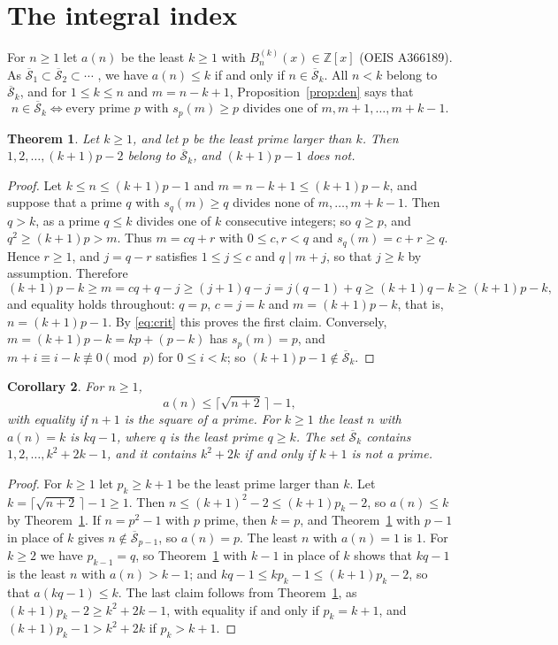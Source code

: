 \documentclass[11pt]{amsart}
\newtheorem{theorem}{Theorem}
\newtheorem{corollary}[theorem]{Corollary}
\theoremstyle{remark}
\numberwithin{equation}{section}
\newcommand{\ZZ}{\mathbb Z}
\newcommand{\Sb}{\overline{\mathcal S}}
\begin{document}
\section{The integral index}\label{sec:index}

For $n\ge1$ let $a(n)$ be the least $k\ge1$ with $B_n^{(k)}(x)\in\ZZ[x]$ (OEIS A366189). As $\Sb_1\subset\Sb_2\subset\cdots$
\cite[Theorem 14]{K24}, we have $a(n)\le k$ if and only if $n\in\Sb_k$. All $n<k$ belong to $\Sb_k$, and for $1\le k\le n$ and
$m=n-k+1$, Proposition~\ref{prop:den} says that
\begin{equation}\label{eq:crit}
n\in\Sb_k\iff\text{every prime $p$ with $s_p(m)\ge p$ divides one of $m,m+1,\dots,m+k-1$.}
\end{equation}

\begin{theorem}\label{thm:gap}
Let $k\ge1$, and let $p$ be the least prime larger than $k$. Then $1,2,\dots,(k+1)p-2$ belong to $\Sb_k$, and $(k+1)p-1$ does not.
\end{theorem}
\begin{proof}
Let $k\le n\le(k+1)p-1$ and $m=n-k+1\le(k+1)p-k$, and suppose that a prime $q$ with $s_q(m)\ge q$ divides none of $m,\dots,m+k-1$.
Then $q>k$, as a prime $q\le k$ divides one of $k$ consecutive integers; so $q\ge p$, and $q^2\ge(k+1)p>m$. Thus $m=cq+r$ with
$0\le c,r<q$ and $s_q(m)=c+r\ge q$. Hence $r\ge1$, and $j=q-r$ satisfies $1\le j\le c$ and $q\mid m+j$, so that $j\ge k$ by assumption.
Therefore
\[
(k+1)p-k\ge m=cq+q-j\ge(j+1)q-j=j(q-1)+q\ge(k+1)q-k\ge(k+1)p-k,
\]
and equality holds throughout: $q=p$, $c=j=k$ and $m=(k+1)p-k$, that is, $n=(k+1)p-1$. By \eqref{eq:crit} this proves the first claim.
Conversely, $m=(k+1)p-k=kp+(p-k)$ has $s_p(m)=p$, and $m+i\equiv i-k\not\equiv0\pmod p$ for $0\le i<k$; so $(k+1)p-1\notin\Sb_k$.
\end{proof}

\begin{corollary}\label{cor:index}
For $n\ge1$,
\[
a(n)\le\lceil\sqrt{n+2}\,\rceil-1,
\]
with equality if $n+1$ is the square of a prime. For $k\ge1$ the least $n$ with $a(n)=k$ is $kq-1$, where $q$ is the least prime
$q\ge k$. The set $\Sb_k$ contains $1,2,\dots,k^2+2k-1$, and it contains $k^2+2k$ if and only if $k+1$ is not a prime.
\end{corollary}
\begin{proof}
For $k\ge1$ let $p_k\ge k+1$ be the least prime larger than $k$. Let $k=\lceil\sqrt{n+2}\,\rceil-1\ge1$. Then
$n\le(k+1)^2-2\le(k+1)p_k-2$, so $a(n)\le k$ by Theorem~\ref{thm:gap}. If $n=p^2-1$ with $p$ prime, then $k=p$, and
Theorem~\ref{thm:gap} with $p-1$ in place of $k$ gives $n\notin\Sb_{p-1}$, so $a(n)=p$. The least $n$ with $a(n)=1$ is $1$. For
$k\ge2$ we have $p_{k-1}=q$, so Theorem~\ref{thm:gap} with $k-1$ in place of $k$ shows that $kq-1$ is the least $n$ with $a(n)>k-1$;
and $kq-1\le kp_k-1\le(k+1)p_k-2$, so that $a(kq-1)\le k$. The last claim follows from Theorem~\ref{thm:gap}, as
$(k+1)p_k-2\ge k^2+2k-1$, with equality if and only if $p_k=k+1$, and $(k+1)p_k-1>k^2+2k$ if $p_k>k+1$.
\end{proof}
\end{document}
